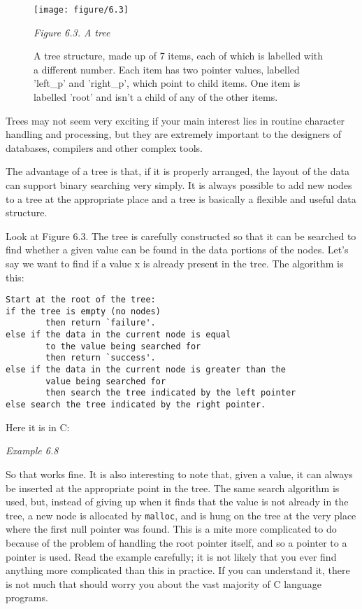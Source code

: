     \begin{figure*}[htb]\centering
      \texttt{[image: figure/6.3]}
      \caption{A tree structure, made up of 7 items,
        each of which is labelled with a different number.
        Each item has two pointer values, labelled 'left\_p' and 'right\_p',
        which point to child items.
        One item is labelled 'root'
        and isn't a child of any of the other  items.}
\begin{center}\textit{Figure 6.3. A tree}\end{center}
    \end{figure*}



   Trees may not seem very exciting if your main interest lies in routine
    character handling and processing, but they are extremely important to the
    designers of databases, compilers and other complex tools.


   The advantage of a tree is that, if it is properly arranged, the layout
    of the data can support binary searching very simply. It is always possible
    to add new nodes to a tree at the appropriate place and a tree is basically
    a flexible and useful data structure.


   Look at Figure 6.3. The tree is carefully constructed so
    that it can be searched to find whether a given value can be found in the
    data portions of the nodes. Let's say we want to find if a value
    x is already present in the tree. The algorithm is this:


   \begin{Verbatim}
Start at the root of the tree:
if the tree is empty (no nodes)
        then return `failure'.
else if the data in the current node is equal
        to the value being searched for
        then return `success'.
else if the data in the current node is greater than the
        value being searched for
        then search the tree indicated by the left pointer
else search the tree indicated by the right pointer.
\end{Verbatim}

   Here it is in C:


   \begin{center}\textit{Example 6.8}\end{center}


   So that works fine. It is also interesting to note that, given a value,
    it can always be inserted at the appropriate point in the tree. The same
    search algorithm is used, but, instead of giving up when it finds that the
    value is not already in the tree, a new node is allocated by
    \texttt{malloc}, and is hung on the tree at the very place where the
    first null pointer was found. This is a mite more complicated to do because
    of the problem of handling the root pointer itself, and so a pointer to
    a pointer is used. Read the example carefully; it is not likely that you
    ever find anything more complicated than this in practice. If you can
    understand it, there is not much that should worry you about the vast
    majority of C language programs.


